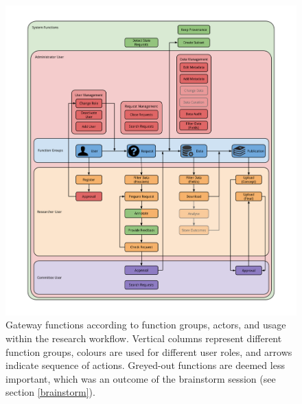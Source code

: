 \begin{figure}[!htb]
	\centering
	\includegraphics[width=1.0\linewidth]{images/functions-in-workflow}
	\caption{
		Gateway functions according to function groups, actors, and usage within the research workflow.
		Vertical columns represent different function groups, colours are used for different user roles, and arrows indicate sequence of actions.
		Greyed-out functions are deemed less important, which was an outcome of the brainstorm session (see section \ref{brainstorm}).
	}
	\label{fig:functions-workflow}
\end{figure}